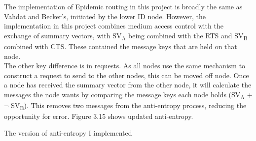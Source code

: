 \documentclass[12pt,a4paper]{report}
\makeatletter
\newenvironment{figurehere}
  {\def\@captype{figure}}
  {}
\makeatother
\begin{document}
The implementation of Epidemic routing in this project is broadly the same as Vahdat and Becker's, initiated by the lower ID node. However, the implementation in this project combines medium access control with the exchange of summary vectors, with SV\textsubscript{A} being combined with the RTS and SV\textsubscript{B} combined with CTS. These contained the message keys that are held on that node. \\
The other key difference is in requests. As all nodes use the same mechanism to construct a request to send to the other nodes, this can be moved off node. Once a node has received the summary vector from the other node, it will calculate the messages the node wants by comparing the message keys each node holds (SV\textsubscript{A} + $\neg$ SV\textsubscript{B}). This removes two messages from the anti-entropy process, reducing the opportunity for error. Figure 3.15 shows updated anti-entropy.

\begin{figurehere} 
\begin{center}
\end{center}
\caption{The version of anti-entropy I implemented}
\end{figurehere} 
\bigskip
\end{document}

